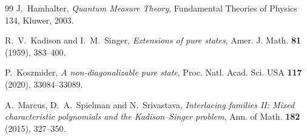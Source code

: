\documentclass[11pt,reqno]{amsart}
\theoremstyle{definition}
\begin{document}
\begin{thebibliography}{99}
 J.~Hamhalter, \emph{Quantum Measure Theory}, Fundamental Theories
of Physics 134, Kluwer, 2003.

 R.~V.~Kadison and I.~M.~Singer, \emph{Extensions of pure
states}, Amer. J. Math. \textbf{81} (1959), 383--400.

 P.~Koszmider, \emph{A non-diagonalizable pure state}, Proc. Natl.
Acad. Sci. USA \textbf{117} (2020), 33084--33089.

 A.~Marcus, D.~A.~Spielman and N.~Srivastava, \emph{Interlacing families
II: Mixed characteristic polynomials and the Kadison--Singer problem}, Ann. of Math.
\textbf{182} (2015), 327--350.

\end{thebibliography}
\end{document}
